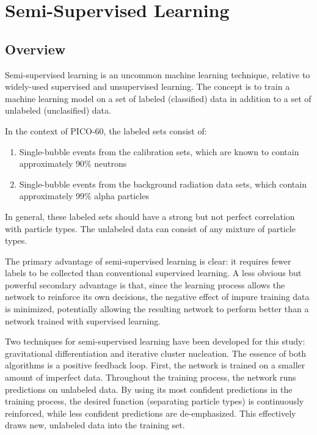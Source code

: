 \documentclass[10pt]{article}
\begin{document}
\section{Semi-Supervised Learning} \label{semi_supervised}

\subsection{Overview}

Semi-supervised learning is an uncommon machine learning technique, relative to widely-used supervised and unsupervised learning. The concept is to train a machine learning model on a set of labeled (classified) data in addition to a set of unlabeled (unclasified) data.

In the context of PICO-60, the labeled sets consist of:

\begin{enumerate}
    \item Single-bubble events from the calibration sets, which are known to contain approximately 90\% neutrons
    \item Single-bubble events from the background radiation data sets, which contain approximately 99\% alpha particles
\end{enumerate}

In general, these labeled sets should have a strong but not perfect correlation with particle types. The unlabeled data can consist of any mixture of particle types.

The primary advantage of semi-supervised learning is clear: it requires fewer labels to be collected than conventional supervised learning. A less obvious but powerful secondary advantage is that, since the learning process allows the network to reinforce its own decisions, the negative effect of impure training data is minimized, potentially allowing the resulting network to perform better than a network trained with supervised learning.

Two techniques for semi-supervised learning have been developed for this study: gravitational differentiation and iterative cluster nucleation. The essence of both algorithms is a positive feedback loop. First, the network is trained on a smaller amount of imperfect data. Throughout the training process, the network runs predictions on unlabeled data. By using its most confident predictions in the training process, the desired function (separating particle types) is continuously reinforced, while less confident predictions are de-emphasized. This effectively draws new, unlabeled data into the training set.
\end{document}
